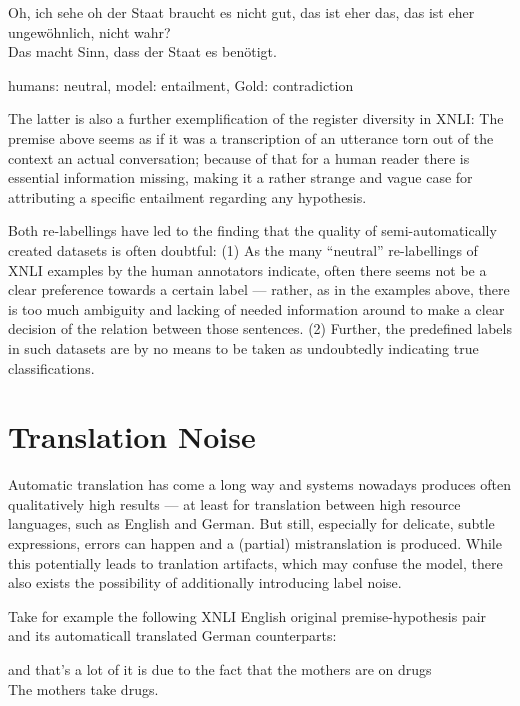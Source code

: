{\begin{examples}
  \item Oh, ich sehe oh der Staat braucht es nicht gut, das ist eher das, das ist eher ungewöhnlich, nicht wahr?\\
        Das macht Sinn, dass der Staat es benötigt.

        humans: neutral, model: entailment, Gold: contradiction
\end{examples}

The latter is also a further exemplification of the register diversity in XNLI: The premise above seems as if it
was a transcription of an utterance torn out of the context an actual conversation; because of that for a human
reader there is essential information missing, making it a rather strange and vague case for attributing
a specific entailment regarding any hypothesis.


Both re-labellings have led to the finding that the quality of semi-automatically
created datasets is often doubtful: (1) As the many ``neutral'' re-labellings of
XNLI examples by the human annotators indicate, often there seems not be a clear
preference towards a certain label --- rather, as in the examples above, there is
too much ambiguity and lacking of needed information around to make a clear decision
of the relation between those sentences. (2) Further, the predefined labels in such
datasets are by no means to be taken as undoubtedly indicating true classifications.



\section{Translation Noise}
\label{sec:translation-noise}

Automatic translation has come a long way and systems nowadays produces often qualitatively high results ---
at least for translation between high resource languages, such as English and German.
But still, especially for delicate, subtle expressions, errors can happen and a (partial) mistranslation
is produced. While this potentially leads to tranlation artifacts, which may confuse the model, there
also exists the possibility of additionally introducing label noise.

Take for example the following XNLI English original premise-hypothesis pair and its automaticall
translated German counterparts:

\begin{examples}
  \item and that's a lot of it is due to the fact that the mothers are on drugs\\
        The mothers take drugs.


\end{examples}}
